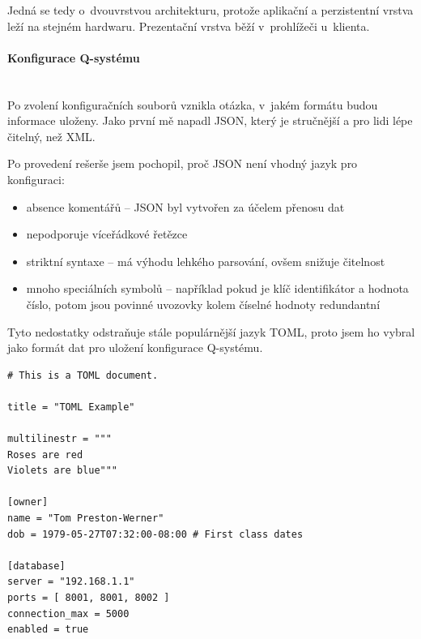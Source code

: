 \documentclass[thesis=M,czech]{FITthesis}[2019/12/23]
\newcommand{\lbparagraph}[1]{\paragraph{#1}\mbox{}\\} %
\begin{document}
Jedná se tedy o~dvouvrstvou architekturu, protože aplikační a perzistentní vrstva leží na stejném hardwaru.
Prezentační vrstva běží v~prohlížeči u~klienta.

\newpage
\lbparagraph{Konfigurace Q-systému}
\label{Konfigurace}
Po zvolení konfiguračních souborů vznikla otázka, v~jakém formátu budou informace uloženy. Jako první mě napadl JSON, který je stručnější a pro lidi lépe čitelný, než XML. 

Po provedení rešerše jsem pochopil, proč JSON není vhodný jazyk pro konfiguraci: \cite{JSON}
\begin{itemize}
	\item absence komentářů -- JSON byl vytvořen za účelem přenosu dat
	\item nepodporuje víceřádkové řetězce
	\item striktní syntaxe -- má výhodu lehkého parsování, ovšem snižuje čitelnost
	\item mnoho speciálních symbolů -- například pokud je klíč identifikátor a hodnota číslo, potom jsou povinné uvozovky kolem číselné hodnoty redundantní
\end{itemize}
Tyto nedostatky odstraňuje stále populárnější jazyk TOML, proto jsem ho vybral jako formát  dat pro uložení konfigurace Q-systému. \cite{TOML}

\begin{lstlisting}[frame=single,caption=Příklad jazyka TOML,label=TomlExample]
# This is a TOML document.

title = "TOML Example"

multilinestr = """
Roses are red
Violets are blue"""

[owner]
name = "Tom Preston-Werner"
dob = 1979-05-27T07:32:00-08:00 # First class dates

[database]
server = "192.168.1.1"
ports = [ 8001, 8001, 8002 ]
connection_max = 5000
enabled = true
\end{lstlisting}
\end{document}
